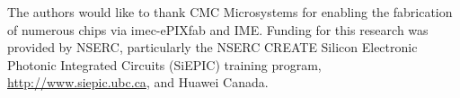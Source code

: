 \documentclass[journal]{spie}
\begin{document}
%
%




\acknowledgments

The authors would like to thank CMC Microsystems for enabling the fabrication of numerous chips via imec-ePIXfab and IME.  Funding for this research was provided by NSERC, particularly the NSERC CREATE Silicon Electronic Photonic Integrated Circuits (SiEPIC) training program, \url{http://www.siepic.ubc.ca}, and Huawei Canada.



\end{document}
